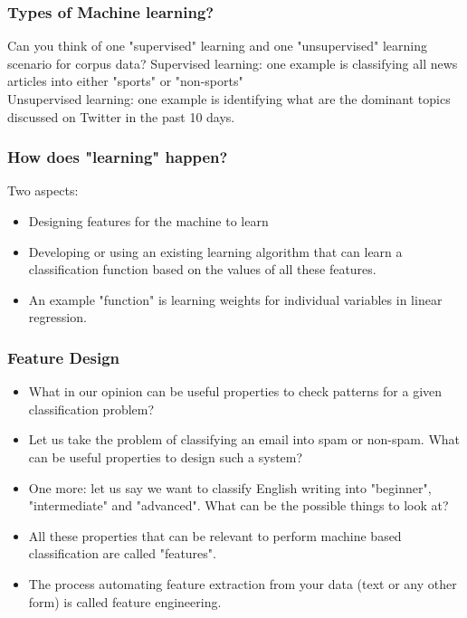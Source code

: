 \documentclass{beamer}
\begin{document}
\begin{frame}
\frametitle{Types of Machine learning?}
Can you think of one "supervised" learning and one "unsupervised" learning scenario for corpus data? 
\pause 
Supervised learning: one example is classifying all news articles into either "sports" or "non-sports" \\
Unsupervised learning: one example is identifying what are the dominant topics discussed on Twitter in the past 10 days. 
\end{frame}

\begin{frame}
\frametitle{How does "learning" happen?}
Two aspects:
\begin{itemize}
\item Designing features for the machine to learn
\item Developing or using an existing learning algorithm that can learn a classification function based on the values of all these features.
\item An example "function" is learning weights for individual variables in linear regression.
\end{itemize}
\end{frame}

\begin{frame}
\frametitle{Feature Design}
\begin{itemize}
\item What in our opinion can be useful properties to check patterns for a given classification problem?
\item Let us take the problem of classifying an email into spam or non-spam. What can be useful properties to design such a system? \pause
\item One more: let us say we want to classify English writing into "beginner", "intermediate" and "advanced". What can be the possible things to look at? \pause
\item All these properties that can be relevant to perform machine based classification are called "features".
\item The process automating feature extraction from your data (text or any other form) is called feature engineering.
\end{itemize}
\end{frame}
\end{document}
